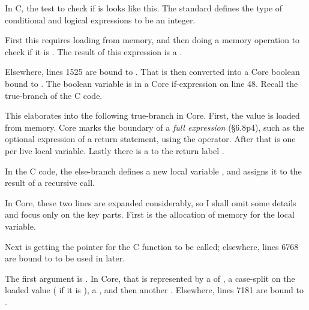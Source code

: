 
In C, the test to check if  is  looks like this. The
standard defines the type of conditional and logical expressions to be an
integer.


First this requires loading  from memory, and then doing a
 memory operation to check if it is .
The result of this expression is a .


Elsewhere, lines 15\textendash{}25 are bound to . That is
then converted into a Core boolean bound to . The boolean
variable is in a Core if-expression on line 48. Recall the true-branch of the C
code.


This elaborates into the following true-branch in Core. First, the value
 is loaded from memory. Core marks the boundary of a \emph{full
expression} (§6.8p4), such as the optional expression of a return statement,
using the  operator. After that is one
 per live local variable. Lastly there is a
 to the return label .


In the C code, the else-branch defines a new local variable ,
and assigns it to the result of a recursive call.


In Core, these two lines are expanded considerably, so I shall omit some
details and focus only on the key parts. First is the allocation of memory for
the local variable.


Next is getting the pointer for the C function to be called; elsewhere, lines
67\textendash{}68 are bound to  to be used in
 later.


The first argument is . In Core, that is represented by a
 of , a case-split on the loaded value
( if it is ), a ,
and then another . Elsewhere, lines 71\textemdash{}81
are bound to .

